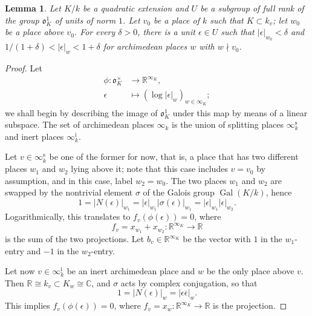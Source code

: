 \documentclass[a4paper, twoside, 11pt]{amsart}
\newtheorem{lemma}[theorem]{Lemma}
\theoremstyle{definition}
\newcommand{\fo}{\mathfrak{o}}
\newcommand{\CC}{\mathbb{C}}
\newcommand{\RR}{\mathbb{R}}
\DeclareMathOperator{\Gal}{Gal}
\begin{document}
\begin{lemma}\label{lem:units-of-norm-1}
	Let $K/k$ be a quadratic extension and $U$ be a subgroup of full rank of the group $\fo_K^1$ of units of norm $1$. Let $v_0$ be a place of $k$ such that $K\subset k_v$; let $w_0$ be a place above $v_0$. For every $\delta>0$, there is a unit $\epsilon\in U$ such that $|\epsilon|_{w_0}<\delta$ and $1/(1+ \delta) < |\epsilon|_{w} < 1+\delta$ for archimedean places $w$ with $w\nmid v_0$.
\end{lemma}
\begin{proof}
	Let 
	\begin{align*}
		\phi \colon \fo_K^\times &\to \RR^{\infty_K},\\\epsilon & \mapsto (\log |\epsilon|_w)_{w\in \infty_K};
	\end{align*}
	we shall begin by describing the image of $\fo_K^1$ under this map by means of a linear subspace.
	The set of archimedean places $\infty_k$ is the union of splitting places $\infty_k^{\mathrm s}$ and inert places $\infty_k^{\mathrm i}$. 

	Let $v\in \infty_k^{\mathrm s}$ be one of the former for now, that is, a place that has two different places $w_1$ and $w_2$ lying above it; note that this case includes $v=v_0$ by assumption, and in this case, label $w_2 = w_0$.
	The two places $w_1$ and $w_2$ are swapped by the nontrivial element $\sigma$ of the Galois group $\Gal(K/k)$, hence
	\begin{equation*}
		1 = |N(\epsilon)|_{w_1} = |\epsilon|_{w_1}|\sigma(\epsilon)|_{w_1} = |\epsilon|_{w_1}|\epsilon|_{w_2}.
	\end{equation*}
	Logarithmically, this translates to
	$f_{v}(\phi(\epsilon))=0$, where
	\begin{equation*}
		f_{v} = x_{w_1}+x_{w_2}\colon \RR^{\infty_K}\to \RR
	\end{equation*}
	is the sum of the two projections.
	Let $b_{v}\in\RR^{\infty_K}$ be the vector with $1$ in the $w_1$-entry and $-1$ in the $w_2$-entry.

	Let now $v\in \infty_k^{\mathrm i}$ be an inert archimedean place and $w$ be the only place above $v$. Then $\RR\cong k_{v} \subset K_{w}\cong \CC$, and $\sigma$ acts by complex conjugation, so that
	\begin{equation*}
		1 = |N(\epsilon)|_{w} = |\epsilon\overline{\epsilon}|_w.
	\end{equation*}
	This implies $f_{v}(\phi(\epsilon))=0$, where $f_{v} = x_w\colon \RR^{\infty_K}\to \RR$ is the projection.
	

\end{proof}
\end{document}
